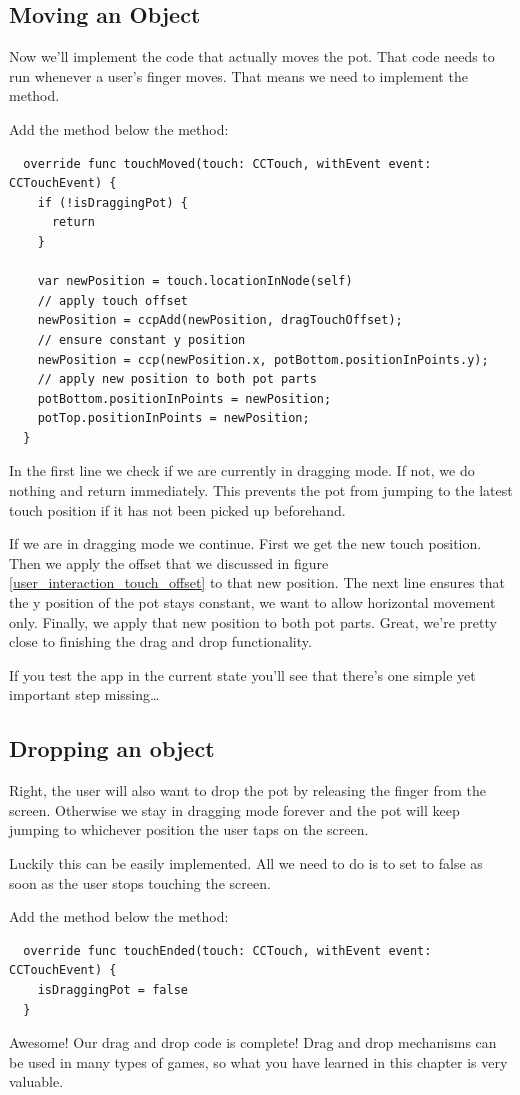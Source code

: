 \subsection{Moving an Object}
Now we'll implement the code that actually moves the pot. That code needs to run
whenever a user's finger moves. That means we need to implement the
 method.
\begin{leftbar}
Add the  method below the  method:
\begin{lstlisting}
  override func touchMoved(touch: CCTouch, withEvent event: CCTouchEvent) {
    if (!isDraggingPot) {
      return
    }
    
    var newPosition = touch.locationInNode(self)
    // apply touch offset
    newPosition = ccpAdd(newPosition, dragTouchOffset);
    // ensure constant y position
    newPosition = ccp(newPosition.x, potBottom.positionInPoints.y);
    // apply new position to both pot parts
    potBottom.positionInPoints = newPosition;
    potTop.positionInPoints = newPosition;
  }
\end{lstlisting}
\end{leftbar}
In the first line we check if we are currently in dragging mode. If not, we do
nothing and return immediately. This prevents the pot from jumping to the latest
touch position if it has not been picked up beforehand.

If we are in dragging mode we continue. First we get the new touch position.
Then we apply the offset that we discussed in figure
\ref{user_interaction_touch_offset} to that new position. The next line ensures
that the y position of the pot stays constant, we want to allow horizontal
movement only. Finally, we apply that new position to both pot parts. Great,
we're pretty close to finishing the drag and drop functionality.

If you test the app in the current state you'll see that there's one simple yet
important step missing\ldots

\subsection{Dropping an object}
Right, the user will also want to drop the pot by releasing the finger from the
screen. Otherwise we stay in dragging mode forever and the pot will keep jumping
to whichever position the user taps on the screen.

Luckily this can be easily implemented. All we need to do is to set
 to false as soon as the user stops touching the
screen.
\begin{leftbar}
Add the  method below the  method:
\begin{lstlisting}
  override func touchEnded(touch: CCTouch, withEvent event: CCTouchEvent) {
    isDraggingPot = false
  }
\end{lstlisting}
\end{leftbar}
Awesome! Our drag and drop code is complete! Drag and drop mechanisms can be
used in many types of games, so what you have learned in this chapter is very
valuable.


